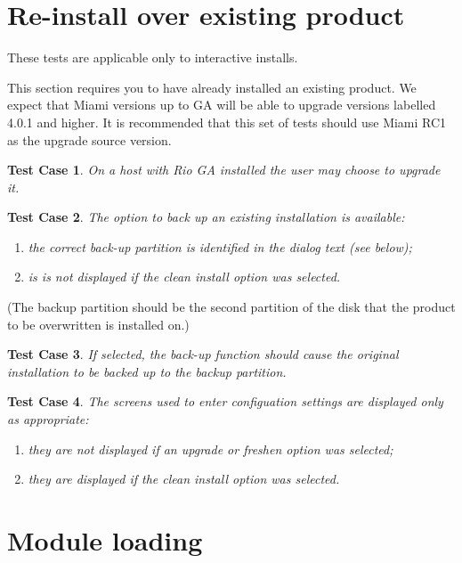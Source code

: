 \documentclass[a4paper]{article}
\newtheorem{testcase}{Test Case}
\begin{document}
\section{Re-install over existing product}

These tests are applicable only to interactive installs.

This section requires you to have already installed an existing
product.  We expect that Miami versions up to GA will be able to
upgrade versions labelled 4.0.1 and higher.  It is recommended that
this set of tests should use Miami RC1 as the upgrade source version.

\begin{testcase}
On a host with Rio GA installed the user may choose to upgrade it.
\end{testcase}

\begin{testcase}
The option to back up an existing installation is available:
\begin{enumerate}
\item the correct back-up partition is identified in the dialog text
  (see below);
\item is is not displayed if the clean install option was selected.
\end{enumerate}
\end{testcase}
(The backup partition should be the second partition of the disk that
the product to be overwritten is installed on.)

\begin{testcase}
If selected, the back-up function should cause the original
installation to be backed up to the backup partition.
\end{testcase}

\begin{testcase}
The screens used to enter configuation settings are displayed only as
appropriate:
\begin{enumerate}
\item they are not displayed if an upgrade or freshen option was selected;
\item they are displayed if the clean install option was selected.
\end{enumerate}
\end{testcase}


\section{Module loading}
\end{document}
